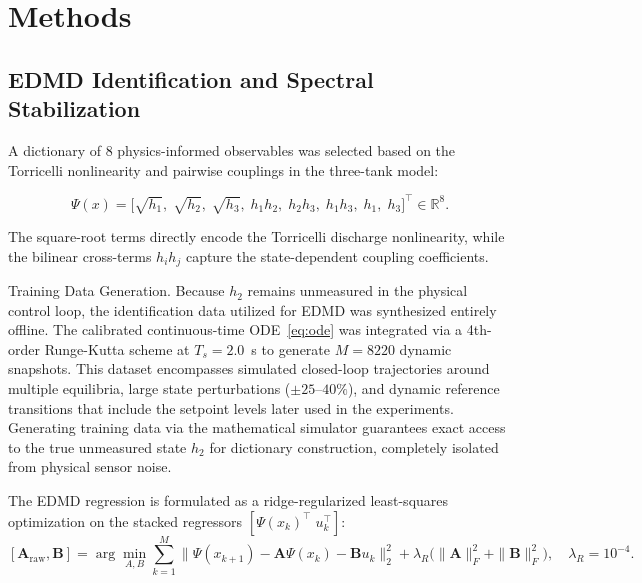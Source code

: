 \documentclass[asi,article,accept,pdftex,moreauthors]{Definitions/mdpi}
\begin{document}
\section{Methods}
\label{sec:methods}

\subsection{EDMD Identification and Spectral Stabilization}
\label{sec:edmd}

A dictionary of 8 physics-informed observables was selected based on the Torricelli
nonlinearity and pairwise couplings in the three-tank model:

\begin{equation}
\Psi(x) = \bigl[\sqrt{h_1},\;\sqrt{h_2},\;\sqrt{h_3},\;h_1h_2,\;h_2h_3,\;h_1h_3,\;h_1,\;h_3\bigr]^\top \in \mathbb{R}^8.
\label{eq:psi}
\end{equation}

The square-root terms directly encode the Torricelli discharge nonlinearity, while the bilinear cross-terms $h_ih_j$ capture the state-dependent coupling coefficients.

{Training Data Generation.
 Because $h_2$ remains unmeasured in the physical control loop, the identification data utilized for EDMD was synthesized entirely offline. The calibrated continuous-time ODE~\eqref{eq:ode} was integrated via a 4th-order Runge-Kutta scheme at $T_s=2.0$~s to generate $M=8220$ dynamic snapshots. This dataset encompasses simulated closed-loop trajectories around multiple equilibria, large state perturbations ($\pm25$--$40\%$), and dynamic reference transitions that include the setpoint levels later used in the experiments. Generating training data via the mathematical simulator guarantees exact access to the true unmeasured state $h_2$ for dictionary construction, completely isolated from physical sensor noise.}

{The EDMD regression is formulated as a ridge-regularized least-squares optimization on the stacked regressors $[\Psi(x_k)^\top\;u_k^\top]$:}
\begin{equation}
{[\mathbf{A}_\mathrm{raw},\mathbf{B}] = \arg\min_{A,B} \sum_{k=1}^{M}
  \bigl\|\Psi(x_{k+1}) - \mathbf{A}\Psi(x_k) - \mathbf{B}u_k\bigr\|_2^2
  + \lambda_R\bigl(\|\mathbf{A}\|_F^2+\|\mathbf{B}\|_F^2\bigr), \quad \lambda_R=10^{-4}.}
\label{eq:edmd}
\end{equation}
\end{document}
